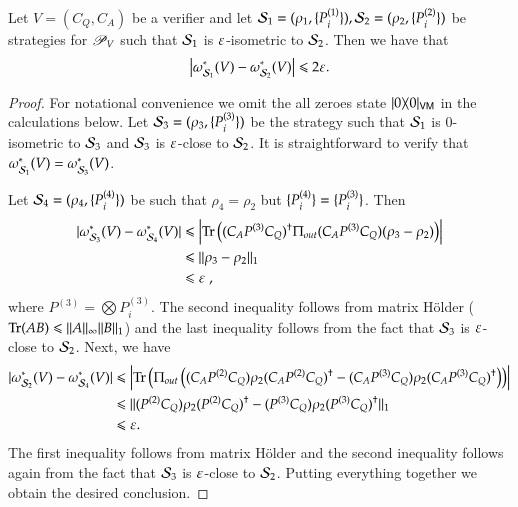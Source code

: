 \begin{lemma}
\label{lem:close_strategies}
	Let $V = (C_Q,C_A)$ be a verifier and let $\mathcal{S}_1 = (\rho_1,\{P^{(1)}_i\}),\mathcal{S}_2= (\rho_2,\{P^{(2)}_i\})$ be strategies for $\mathscr{P}_V$ such that $\mathcal{S}_1$ is $\varepsilon$-isometric to $\mathcal{S}_2$. Then we have that
	\[
		\left\lvert \omega_{\mathcal{S}_1}^*(V) - \omega_{\mathcal{S}_2}^*(V) \right\rvert \leqslant 2\varepsilon.
	\]
\end{lemma}
\begin{proof}
For notational convenience we omit the all zeroes state $|0\rangle\! \langle 0|_{{\mathsf{V}} {\mathsf{M}}}$ in the calculations below. Let $\mathcal{S}_3= (\rho_3,\{P^{(3)}_i\})$ be the strategy such that $\mathcal{S}_1$ is $0$-isometric to $\mathcal{S}_3$ and $\mathcal{S}_3$ is $\varepsilon$-close to $\mathcal{S}_2$. It is straightforward to verify that $\omega_{\mathcal{S}_1}^*(V) = \omega_{\mathcal{S}_3}^*(V)$. 
	
	Let $\mathcal{S}_4 = (\rho_4,\{ P^{(4)}_i\})$ be such that $\rho_4 = \rho_2$ but $\{P^{(4)}_i\} = \{P^{(3)}_i\}$. Then
	\begin{align*}
		\lvert \omega^*_{\mathcal{S}_3}(V) - \omega^*_{\mathcal{S}_4}(V)\rvert &\leqslant \left\lvert \operatorname{Tr}\left( (C_A P^{(3)} C_Q)^\dagger \Pi_{out} (C_A P^{(3)} C_Q) (\rho_3 - \rho_2)\right) \right\rvert \\
		&\leqslant \lVert \rho_3 - \rho_2\rVert_1 \\
		&\leqslant \varepsilon\;,
	\end{align*}
	where $P^{(3)} = \bigotimes P^{(3)}_i$. The second inequality follows from matrix H\"{o}lder ($\operatorname{Tr}(AB) \leqslant \|A\|_\infty \|B\|_1$) and the last inequality follows from the fact that $\mathcal{S}_3$ is $\varepsilon$-close to $\mathcal{S}_2$.
	Next, we have
	\begin{align*}
		\lvert \omega^*_{\mathcal{S}_2}(V) - \omega^*_{\mathcal{S}_4}(V)\rvert &\leqslant \left\lvert \operatorname{Tr}\left( \Pi_{out} \left( (C_A P^{(2)} C_Q)\rho_2 (C_A P^{(2)} C_Q)^\dagger  - (C_A P^{(3)} C_Q) \rho_2 (C_A P^{(3)} C_Q)^\dagger  \right) \right)\right\rvert \\
		&\leqslant \lVert (P^{(2)} C_Q) \rho_2 (P^{(2)} C_Q)^\dagger - (P^{(3)} C_Q) \rho_2 (P^{(3)} C_Q)^\dagger\rVert_1 \\
		&\leqslant \varepsilon.
	\end{align*}	
	The first inequality follows from matrix H\"{o}lder and the second inequality follows again from the fact that $\mathcal{S}_3$ is $\varepsilon$-close to $\mathcal{S}_2$. Putting everything together we obtain the desired conclusion.

\end{proof}










